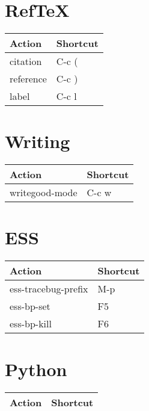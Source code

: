 \documentclass[english]{rcalibrionecolumn}
\begin{document}
\section{Ref\TeX}
\label{sec-15}


\begin{center}
\begin{tabular}{ll}
 \textbf{Action}  &  \textbf{Shortcut}  \\
\hline
 citation         &  C-c (              \\
 reference        &  C-c )              \\
 label            &  C-c l              \\
\end{tabular}
\end{center}
\section{Writing}
\label{sec-16}


\begin{center}
\begin{tabular}{ll}
 \textbf{Action}  &  \textbf{Shortcut}  \\
\hline
 writegood-mode   &  C-c w              \\
\end{tabular}
\end{center}
\section{ESS}
\label{sec-17}


\begin{center}
\begin{tabular}{ll}
 \textbf{Action}      &  \textbf{Shortcut}  \\
\hline
 ess-tracebug-prefix  &  M-p                \\
 ess-bp-set           &  F5                 \\
 ess-bp-kill          &  F6                 \\
\end{tabular}
\end{center}
\section{Python}
\label{sec-18}


\begin{center}
\begin{tabular}{ll}
 \textbf{Action}  &  \textbf{Shortcut}  \\
\hline
\end{tabular}
\end{center}
\end{document}
